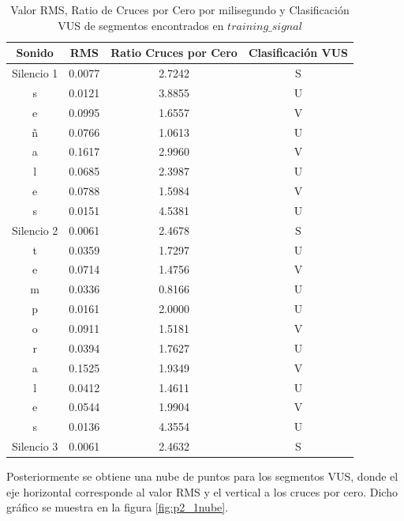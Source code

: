 \begin{table}[H]
    \centering
    \begin{tabular}{c|c|c|c}
        Sonido & RMS & Ratio Cruces por Cero & Clasificación VUS  \\ \hline
        Silencio 1    &0.0077     &2.7242 &S\\
        s             &0.0121     &3.8855 &U\\
        e             &0.0995     &1.6557 &V\\
        ñ             &0.0766     &1.0613 &U\\
        a             &0.1617     &2.9960 &V\\
        l             &0.0685     &2.3987 &U\\
        e             &0.0788     &1.5984 &V\\
        s             &0.0151     &4.5381 &U\\
        Silencio 2    &0.0061     &2.4678 &S\\
        t             &0.0359     &1.7297 &U\\
        e             &0.0714     &1.4756 &V\\
        m             &0.0336     &0.8166 &U\\
        p             &0.0161     &2.0000 &U\\
        o             &0.0911     &1.5181 &V\\
        r             &0.0394     &1.7627 &U\\
        a             &0.1525     &1.9349 &V\\
        l             &0.0412     &1.4611 &U\\
        e             &0.0544     &1.9904 &V\\
        s             &0.0136     &4.3554 &U\\
        Silencio 3    &0.0061     &2.4632 &S
    \end{tabular}
    \caption{Valor RMS, Ratio de Cruces por Cero por milisegundo y Clasificación VUS de segmentos encontrados en $training\_signal$}
    \label{tab:p2_1tab}
\end{table}

Posteriormente se obtiene una nube de puntos para los segmentos VUS, donde el eje horizontal corresponde al valor RMS y el vertical a los cruces por cero. Dicho gráfico se muestra en la figura \ref{fig:p2_1nube}.

